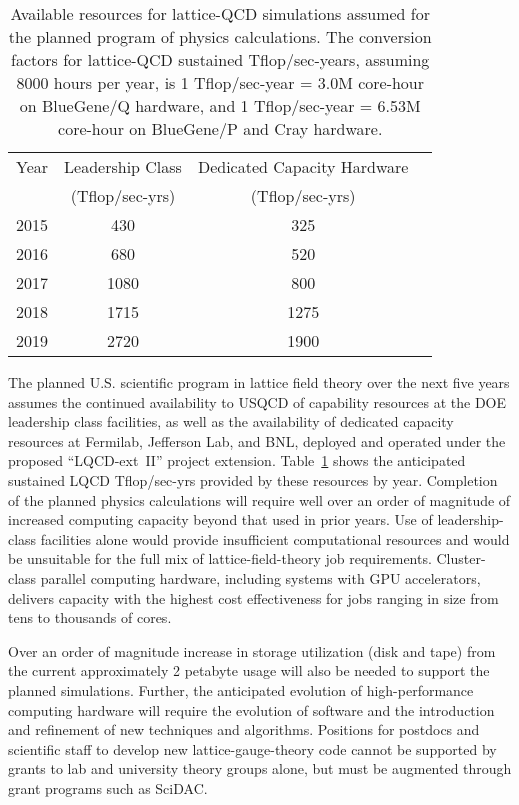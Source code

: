 \begin{table}[t]
\begin{center}
\caption{Available resources for lattice-QCD simulations assumed for the
planned program of physics calculations.  The conversion factors for
lattice-QCD sustained Tflop/sec-years, assuming 8000 hours per year, is 1
Tflop/sec-year = 3.0M core-hour on BlueGene/Q hardware, and 1 Tflop/sec-year =
6.53M core-hour on BlueGene/P and Cray hardware. \vspace{1.5mm}}
\begin{tabular}{lccc}
\hline\hline  
Year & Leadership Class  & Dedicated Capacity Hardware  \\[-0.75mm] 
& (Tflop/sec-yrs) & (Tflop/sec-yrs) \\[0.5mm] \hline
2015 & 430 & 325 \\
2016 & 680 & 520 \\
2017 & 1080 & 800 \\
2018 & 1715 & 1275 \\ 
2019 & 2720 & 1900 \\ \hline\hline
\end{tabular}
\label{tab:fiveyear}
\end{center}
\end{table}
  
The planned U.S. scientific program in lattice field theory over the next
five years assumes the continued availability to USQCD of capability resources
at the DOE leadership class facilities, as well as the availability of
dedicated capacity resources at Fermilab, Jefferson Lab, and BNL, deployed and
operated under the proposed ``LQCD-ext~II'' project extension.  Table~\ref{tab:fiveyear}
shows the anticipated sustained LQCD Tflop/sec-yrs provided by these resources
by year.  Completion of the planned physics calculations will require well
over an order of magnitude of increased computing capacity beyond that used in
prior years.  Use of leadership-class facilities alone would provide
insufficient computational resources and would be unsuitable for the full mix
of lattice-field-theory job requirements.  Cluster-class parallel computing
hardware, including systems with GPU accelerators, delivers capacity with the
highest cost effectiveness for jobs ranging in size from tens to thousands of
cores.

Over an order of magnitude increase in storage utilization (disk and tape)
from the current approximately 2 petabyte usage will also be needed to support
the planned simulations.  Further, the anticipated evolution of high-performance computing hardware will require the evolution of software and the
introduction and refinement of new techniques and algorithms.  Positions for
postdocs and scientific staff to develop new lattice-gauge-theory code cannot
be supported by grants to lab and university theory groups alone, but must be
augmented through grant programs such as SciDAC.

